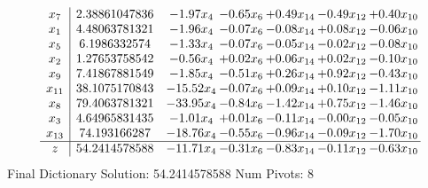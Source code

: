 \documentclass[9pt]{article}
\begin{document}
 \[\begin{array}{c| c c@{\hskip 2pt} c@{\hskip 2pt} c@{\hskip 2pt} c@{\hskip 2pt} c@{\hskip 2pt} }
 x_{7}   &  2.38861047836 & -1.97 x_{4} & -0.65 x_{6} & +  0.49 x_{14} & -0.49 x_{12} & +  0.40 x_{10}\\
 x_{1}   &  4.48063781321 & -1.96 x_{4} & -0.07 x_{6} & -0.08 x_{14} & +  0.08 x_{12} & -0.06 x_{10}\\
 x_{5}   &  6.1986332574 & -1.33 x_{4} & -0.07 x_{6} & -0.05 x_{14} & -0.02 x_{12} & -0.08 x_{10}\\
 x_{2}   &  1.27653758542 & -0.56 x_{4} & +  0.02 x_{6} & +  0.06 x_{14} & +  0.02 x_{12} & -0.10 x_{10}\\
 x_{9}   &  7.41867881549 & -1.85 x_{4} & -0.51 x_{6} & +  0.26 x_{14} & +  0.92 x_{12} & -0.43 x_{10}\\
 x_{11}   &  38.1075170843 & -15.52 x_{4} & -0.07 x_{6} & +  0.09 x_{14} & +  0.10 x_{12} & -1.11 x_{10}\\
 x_{8}   &  79.4063781321 & -33.95 x_{4} & -0.84 x_{6} & -1.42 x_{14} & +  0.75 x_{12} & -1.46 x_{10}\\
 x_{3}   &  4.64965831435 & -1.01 x_{4} & +  0.01 x_{6} & -0.11 x_{14} & -0.00 x_{12} & -0.05 x_{10}\\
 x_{13}   &  74.193166287 & -18.76 x_{4} & -0.55 x_{6} & -0.96 x_{14} & -0.09 x_{12} & -1.70 x_{10}\\
\hline
z    &  54.2414578588 & -11.71 x_{4} & -0.31 x_{6} & -0.83 x_{14} & -0.11 x_{12} & -0.63 x_{10}\\
\end{array}\]
Final Dictionary
Solution:  54.2414578588
Num Pivots:  8
\end{document}
